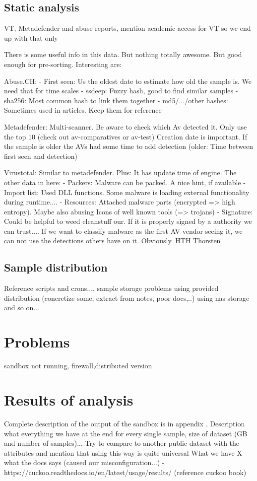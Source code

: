 \subsection{Static analysis}
VT, Metadefender and abuse reports, mention academic access for VT so we end up with that only

There is some useful info in this data. But nothing totally awesome. But good enough for pre-sorting.
Interesting are:

Abuse.CH:
- First seen: Us the oldest date to estimate how old the sample is. We need that for time scales
- ssdeep: Fuzzy hash, good to find similar samples
- sha256: Most common hash to link them together
- md5/.../other hashes: Sometimes used in articles. Keep them for reference

Metadefender:
Multi-scanner. Be aware to check which Av detected it. Only use the top 10 (check out av-comparatives or av-test)
Creation date is important. If the sample is older the AVs had some time to add detection (older: Time between first seen and detection)


Virustotal:
Similar to metadefender. Plus: It has update time of engine.
The other data in here:
- Packers: Malware can be packed. A nice hint, if available
- Import list: Used DLL functions. Some malware is loading external functionality during runtime....
- Resources: Attached malware parts (encrypted => high entropy). Maybe also abusing Icons of well known tools (=> trojans)
- Signature: Could be helpful to weed cleanstuff our. If it is properly signed by a authority we can trust....
If we want to classify malware as the first AV vendor seeing it, we can not use the detections others have on it. Obviously.
HTH
Thorsten


\subsection{Sample distribution}
Reference scripts and crons..., sample storage
problems using provided distribution (concretize some, extract from notes, poor docs,..)
using nas storage and so on...



\section{Problems}
sandbox not running, firewall,distributed version

\section{Results of analysis}
Complete description of the output of the sandbox is in appendix .
Description what everything we have at the end for every single sample, size of dataset (GB and number of samples)...
Try to compare to another public dataset with the attributes and mention that using this way is quite universal
What we have X what the docs says (caused our misconfiguration...) - https://cuckoo.readthedocs.io/en/latest/usage/results/ (reference cuckoo book)

